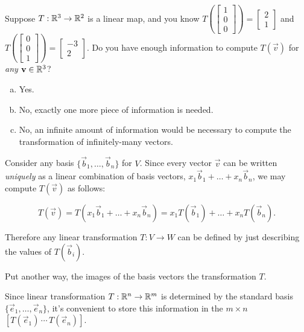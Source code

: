 \begin{applicationActivities}
\begin{activity}{5}
Suppose \(T: \mathbb{R}^3 \rightarrow \mathbb{R}^2\) is a linear map, and you know
\(
  T\left(\begin{bmatrix} 1 \\ 0 \\ 0 \end{bmatrix} \right)
=
  \begin{bmatrix} 2 \\ 1 \end{bmatrix}
\)
and
\(
  T\left(\begin{bmatrix} 0 \\ 0 \\ 1 \end{bmatrix} \right)
=
  \begin{bmatrix} -3 \\ 2 \end{bmatrix}
\).
Do you have enough information to compute
\(T(\vec{v})\) for \textit{any} \(\mathbf v\in\mathbb{R}^3\)?
\begin{enumerate}[(a)]
\item Yes.
\item No, exactly one more piece of information is needed.
\item No, an infinite amount of information would be necessary to compute
      the transformation of infinitely-many vectors.
\end{enumerate}
\end{activity}

\begin{fact}
Consider any basis \(\{\vec b_1,\dots,\vec b_n\}\) for $V$.  Since every
vector \(\vec v\) can be written \textit{uniquely} as a linear combination of
basis vectors, \(x_1\vec b_1+\dots+ x_n\vec b_n\), we may compute
\(T(\vec v)\) as follows:

\[
  T(\vec v)=T(x_1\vec b_1+\dots+ x_n\vec b_n)=
  x_1T(\vec b_1)+\dots+x_nT(\vec b_n)
.\]

Therefore any linear transformation \(T:V \rightarrow W\) can be defined
by just describing the values of \(T(\vec b_i)\).

Put another way, the images of the basis vectors  the transformation \(T\).
\end{fact}

\begin{definition}
Since linear transformation \(T:\mathbb{R}^n\to\mathbb{R}^m\) is determined by
the standard basis \(\{\vec e_1,\dots,\vec e_n\}\), it's convenient to
store this information in the \(m\times n\) 
\([T(\vec e_1) \,\cdots\, T(\vec e_n)]\).


\end{definition}
\end{applicationActivities}
